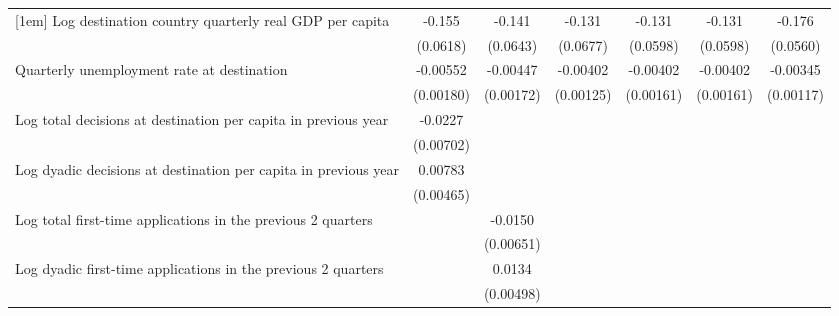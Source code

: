 \begin{table}[htbp]
\begin{tabular}{l*{6}{c}}
[1em]
Log destination country quarterly real GDP per capita&      -0.155\sym{*}  &      -0.141\sym{*}  &      -0.131         &      -0.131\sym{*}  &      -0.131\sym{*}  &      -0.176\sym{**} \\
                    &    (0.0618)         &    (0.0643)         &    (0.0677)         &    (0.0598)         &    (0.0598)         &    (0.0560)         \\
[1em]
Quarterly unemployment rate at destination&    -0.00552\sym{**} &    -0.00447\sym{*}  &    -0.00402\sym{**} &    -0.00402\sym{*}  &    -0.00402\sym{*}  &    -0.00345\sym{**} \\
                    &   (0.00180)         &   (0.00172)         &   (0.00125)         &   (0.00161)         &   (0.00161)         &   (0.00117)         \\
[1em]
Log total decisions at destination per capita in previous year&     -0.0227\sym{**} &                     &                     &                     &                     &                     \\
                    &   (0.00702)         &                     &                     &                     &                     &                     \\
[1em]
Log dyadic decisions at destination per capita in previous year&     0.00783         &                     &                     &                     &                     &                     \\
                    &   (0.00465)         &                     &                     &                     &                     &                     \\
[1em]
Log total first-time applications in the previous 2 quarters&                     &     -0.0150\sym{*}  &                     &                     &                     &                     \\
                    &                     &   (0.00651)         &                     &                     &                     &                     \\
[1em]
Log dyadic first-time applications in the previous 2 quarters&                     &      0.0134\sym{**} &                     &                     &                     &                     \\
                    &                     &   (0.00498)         &                     &                     &                     &                     \\
[1em]

\end{tabular}
\end{table}
